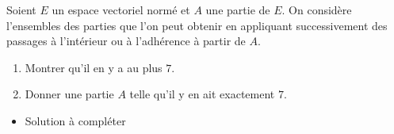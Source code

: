 \begin{enonce}
\begin{exercise}[ID={RMS134 E667},subtitle={Mines-Ponts MP 2023},tags={analyse, mines-ponts, 2023},difficulty={}]
  Soient $E$ un espace vectoriel normé et $A$ une partie de $E$. On
 considère l'ensembles des parties que l'on peut obtenir en appliquant
 successivement des passages à l'intérieur ou à l'adhérence à partir
 de $A$.
 \begin{enumerate}[\bfseries a)]
 \item Montrer qu'il en y a au plus $7$.
 \item Donner une partie $A$ telle qu'il y en ait exactement $7$.
 \end{enumerate}
\end{exercise}
\begin{solution}
  \begin{itemize}
    \item Solution à compléter
  \end{itemize}
\end{solution}
\end{enonce}